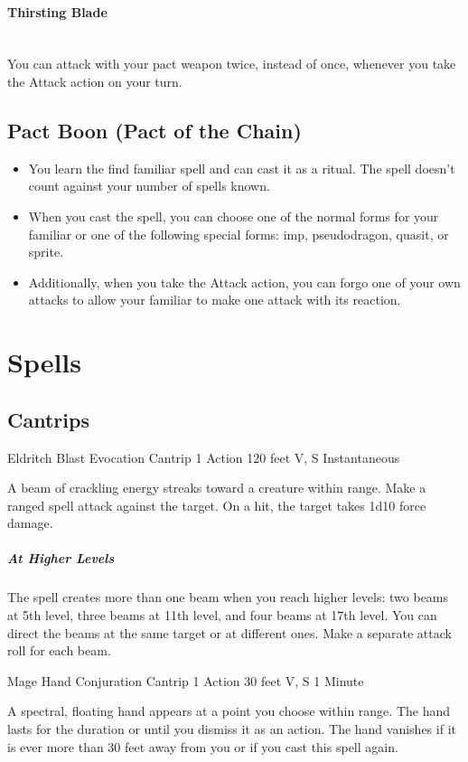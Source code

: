 {\paragraph*{Thirsting Blade}\hfill\\
You can attack with your pact weapon twice, instead of once, whenever you take the Attack action on your turn.

\subsection*{Pact Boon (Pact of the Chain)}
\begin{itemize}
	\item You learn the find familiar spell and can cast it as a ritual. The spell doesn't count against your number of spells known.
	\item When you cast the spell, you can choose one of the normal forms for your familiar or one of the following special forms: imp, pseudodragon, quasit, or sprite.
	\item Additionally, when you take the Attack action, you can forgo one of your own attacks to allow your familiar to make one attack with its reaction.
\end{itemize}

\section*{Spells}
\subsection*{Cantrips}

\DndSpellHeader
	{Eldritch Blast}
	{Evocation Cantrip}
	{1 Action}
	{120 feet}
	{V, S}
	{Instantaneous}

A beam of crackling energy streaks toward a creature within range. Make a ranged spell attack against the target. On a hit, the target takes 1d10 force damage.

\subparagraph*{At Higher Levels} The spell creates more than one beam when you reach higher levels: two beams at 5th level, three beams at 11th level, and four beams at 17th level. You can direct the beams at the same target or at different ones. Make a separate attack roll for each beam.

\DndSpellHeader
	{Mage Hand}
	{Conjuration Cantrip}
	{1 Action}
	{30 feet}
	{V, S}
	{1 Minute}

A spectral, floating hand appears at a point you choose within range. The hand lasts for the duration or until you dismiss it as an action. The hand vanishes if it is ever more than 30 feet away from you or if you cast this spell again.

}
